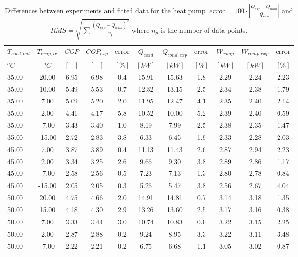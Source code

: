 \documentclass[english]{SPFShortReport}
\begin{document}
\begin{table}[!ht]
\begin{small}
\caption{Differences between experiments and fitted data for the heat pump.          $error=100 \cdot |\frac{Q_{exp}-Q_{num}}{Q_{exp}}|$ and $RMS = \sqrt { \sum{\frac{(Q_{exp}-Q_{num})^2}{n_p}} }$ where $n_p$ is the number of data points.}
\begin{center}
\resizebox{12cm}{!} 
{
\begin{tabular}{l | c c c c c c c c c c } 
\hline
\hline
$T_{cond,out}$ &$T_{evap,in}$ &$COP$ &$COP_{exp}$ &error &$Q_{cond}$ &$Q_{cond,exp}$ &error &$W_{comp}$ &$W_{comp,exp}$ &error \\ 
$^oC$ &$^oC$ &$[-]$ &$[-]$ &$[\%]$ &$[kW]$ &$[kW]$ &$[\%]$ &$[kW]$ &$[kW]$ &$[\%]$\\ 
\hline
35.00  & 20.00 & 6.95 & 6.98 & 0.4 & 15.91 & 15.63 & 1.8 & 2.29 & 2.24 & 2.23\\ 
35.00  & 10.00 & 5.49 & 5.53 & 0.7 & 12.82 & 13.15 & 2.5 & 2.34 & 2.38 & 1.79\\ 
35.00  & 7.00 & 5.09 & 5.20 & 2.0 & 11.95 & 12.47 & 4.1 & 2.35 & 2.40 & 2.14\\ 
35.00  & 2.00 & 4.41 & 4.17 & 5.8 & 10.52 & 10.00 & 5.2 & 2.39 & 2.40 & 0.59\\ 
35.00  & -7.00 & 3.43 & 3.40 & 1.0 & 8.19 & 7.99 & 2.5 & 2.38 & 2.35 & 1.47\\ 
35.00  & -15.00 & 2.72 & 2.83 & 3.8 & 6.33 & 6.45 & 1.9 & 2.33 & 2.28 & 2.03\\ 
45.00  & 7.00 & 3.87 & 3.89 & 0.4 & 11.13 & 11.43 & 2.6 & 2.87 & 2.94 & 2.23\\ 
45.00  & 2.00 & 3.34 & 3.25 & 2.6 & 9.66 & 9.30 & 3.8 & 2.89 & 2.86 & 1.17\\ 
45.00  & -7.00 & 2.58 & 2.56 & 0.5 & 7.23 & 7.13 & 1.3 & 2.80 & 2.78 & 0.84\\ 
45.00  & -15.00 & 2.05 & 2.05 & 0.3 & 5.26 & 5.47 & 3.8 & 2.56 & 2.67 & 4.04\\ 
50.00  & 20.00 & 4.75 & 4.66 & 2.0 & 14.91 & 14.81 & 0.7 & 3.14 & 3.18 & 1.35\\ 
50.00  & 15.00 & 4.18 & 4.30 & 2.9 & 13.26 & 13.60 & 2.5 & 3.17 & 3.16 & 0.38\\ 
50.00  & 7.00 & 3.33 & 3.44 & 3.0 & 10.74 & 10.83 & 0.9 & 3.22 & 3.15 & 2.25\\ 
50.00  & 2.00 & 2.87 & 2.88 & 0.2 & 9.24 & 8.95 & 3.3 & 3.22 & 3.11 & 3.48\\ 
50.00  & -7.00 & 2.22 & 2.21 & 0.2 & 6.75 & 6.68 & 1.1 & 3.05 & 3.02 & 0.87\\ 

\end{tabular}}
\end{center}
\end{small}
\end{table}
\end{document}
